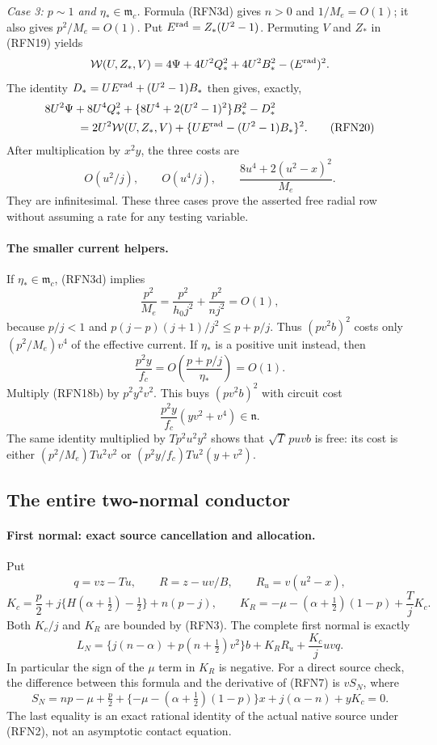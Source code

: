 \emph{Case 3: $p\sim1$ and $\eta_*\in\mathfrak m_c$.}
Formula (RFN3d) gives $n>0$ and $1/M_e=O(1)$; it also gives
$p^2/M_e=O(1)$.  Put $E^{\rm rad}=Z_*(U^2-1)$.
Permuting $V$ and $Z_*$ in (RFN19) yields
\[
 \mathcal W(U,Z_*,V)
   =4\Psi+4U^2Q_*^2+4U^2B_*^2-(E^{\rm rad})^2.
\]
The identity $D_*=UE^{\rm rad}+(U^2-1)B_*$ then gives, exactly,
\begin{align}
 &8U^2\Psi+8U^4Q_*^2+
   \{8U^4+2(U^2-1)^2\}B_*^2-D_*^2\\
 &\hspace{10mm}=2U^2\mathcal W(U,Z_*,V)
                 +\{UE^{\rm rad}-(U^2-1)B_*\}^2.        \tag{RFN20}
\end{align}
After multiplication by $x^2y$, the three costs are
\[
 O(u^2/j),\qquad O(u^4/j),\qquad
 \frac{8u^4+2(u^2-x)^2}{M_e}.
\]
They are infinitesimal.  These three cases prove the asserted free
radial row without assuming a rate for any testing variable.

\paragraph{The smaller current helpers.}
If $\eta_*\in\mathfrak m_c$, (RFN3d) implies
\[
 \frac{p^2}{M_e}
 =\frac{p^2}{h_0j^2}+\frac{p^2}{nj^2}=O(1),
\]
because $p/j<1$ and
$p(j-p)(j+1)/j^2\leq p+p/j$.
Thus $(pv^2b)^2$ costs only $(p^2/M_e)v^4$ of the effective current.
If $\eta_*$ is a positive unit instead, then
\[
 \frac{p^2y}{f_c}=O\!\left(\frac{p+p/j}{\eta_*}\right)=O(1).
\]
Multiply (RFN18b) by $p^2y^2v^2$.  This buys $(pv^2b)^2$ with circuit
cost
\[
 \frac{p^2y}{f_c}(yv^2+v^4)\in\mathfrak n.
\]
The same identity multiplied by $Tp^2u^2y^2$ shows that
$\sqrt T\,puvb$ is free: its cost is either
$(p^2/M_e)Tu^2v^2$ or
$(p^2y/f_c)Tu^2(y+v^2)$.

\subsection{The entire two-normal conductor}

\paragraph{First normal: exact source cancellation and allocation.}
Put
\[
 q=vz-Tu,\qquad R=z-uv/B,\qquad R_u=v(u^2-x),
\]
\[
 K_c=\frac p2+j\{H(\alpha+\tfrac12)-\tfrac12\}+n(p-j),
 \qquad
 K_R=-\mu-(\alpha+\tfrac12)(1-p)+\frac TjK_c.
\]
Both $K_c/j$ and $K_R$ are bounded by (RFN3).  The complete first normal
is exactly
\[
 L_N=\{j(n-\alpha)+p(n+\tfrac12)v^2\}b
                  +K_RR_u+\frac{K_c}{j}uvq.            \tag{RFN21}
\]
In particular the sign of the $\mu$ term in $K_R$ is negative.
For a direct source check, the difference between this formula and
the derivative of (RFN7) is $vS_N$, where
\[
 S_N=np-\mu+\tfrac p2+
       \{-\mu-(\alpha+\tfrac12)(1-p)\}x
       +j(\alpha-n)+yK_c=0.
\]
The last equality is an exact rational identity of the actual native
source under (RFN2), not an asymptotic contact equation.

